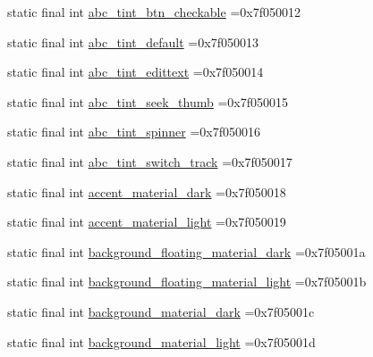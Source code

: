 \begin{DoxyCompactItemize}
\item 
static final int \mbox{\hyperlink{classbr_1_1unb_1_1cic_1_1mp_1_1marketmaster_1_1test_1_1R_1_1color_aecae2710ecdcdf673d196d3c4daa3d39}{abc\+\_\+tint\+\_\+btn\+\_\+checkable}} =0x7f050012
\item 
static final int \mbox{\hyperlink{classbr_1_1unb_1_1cic_1_1mp_1_1marketmaster_1_1test_1_1R_1_1color_a6661519f2e28b27f89c91229e89eda42}{abc\+\_\+tint\+\_\+default}} =0x7f050013
\item 
static final int \mbox{\hyperlink{classbr_1_1unb_1_1cic_1_1mp_1_1marketmaster_1_1test_1_1R_1_1color_ab2e24e9ce3a7db64029966a2201a6da5}{abc\+\_\+tint\+\_\+edittext}} =0x7f050014
\item 
static final int \mbox{\hyperlink{classbr_1_1unb_1_1cic_1_1mp_1_1marketmaster_1_1test_1_1R_1_1color_a3a6fa950df0e92796dc6b8ffe155c3c5}{abc\+\_\+tint\+\_\+seek\+\_\+thumb}} =0x7f050015
\item 
static final int \mbox{\hyperlink{classbr_1_1unb_1_1cic_1_1mp_1_1marketmaster_1_1test_1_1R_1_1color_aeb5b4dae03d29c85d0a9315f4ae5ae7b}{abc\+\_\+tint\+\_\+spinner}} =0x7f050016
\item 
static final int \mbox{\hyperlink{classbr_1_1unb_1_1cic_1_1mp_1_1marketmaster_1_1test_1_1R_1_1color_a10abe17f5e9029f5635310242a861b0e}{abc\+\_\+tint\+\_\+switch\+\_\+track}} =0x7f050017
\item 
static final int \mbox{\hyperlink{classbr_1_1unb_1_1cic_1_1mp_1_1marketmaster_1_1test_1_1R_1_1color_af6b27e114fb72a83189058833f11a02b}{accent\+\_\+material\+\_\+dark}} =0x7f050018
\item 
static final int \mbox{\hyperlink{classbr_1_1unb_1_1cic_1_1mp_1_1marketmaster_1_1test_1_1R_1_1color_a759d5c60e2eb882d733514e9b0948d3a}{accent\+\_\+material\+\_\+light}} =0x7f050019
\item 
static final int \mbox{\hyperlink{classbr_1_1unb_1_1cic_1_1mp_1_1marketmaster_1_1test_1_1R_1_1color_a76d320237a0c1110d00c0731478af554}{background\+\_\+floating\+\_\+material\+\_\+dark}} =0x7f05001a
\item 
static final int \mbox{\hyperlink{classbr_1_1unb_1_1cic_1_1mp_1_1marketmaster_1_1test_1_1R_1_1color_a951ae2d4eaaa12402dbda238187cd29b}{background\+\_\+floating\+\_\+material\+\_\+light}} =0x7f05001b
\item 
static final int \mbox{\hyperlink{classbr_1_1unb_1_1cic_1_1mp_1_1marketmaster_1_1test_1_1R_1_1color_a425c1786edffa5c3c5861655f42fe873}{background\+\_\+material\+\_\+dark}} =0x7f05001c
\item 
static final int \mbox{\hyperlink{classbr_1_1unb_1_1cic_1_1mp_1_1marketmaster_1_1test_1_1R_1_1color_a0759e0c11771f61c076aeb7af861ed75}{background\+\_\+material\+\_\+light}} =0x7f05001d

\end{DoxyCompactItemize}
